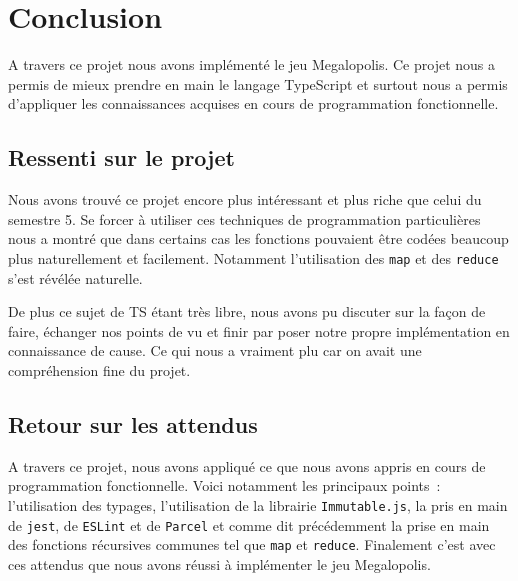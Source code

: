 \section{Conclusion}

A travers ce projet nous avons implémenté le jeu Megalopolis. Ce projet nous a permis de mieux prendre en main le langage TypeScript et surtout nous a permis d'appliquer les connaissances acquises en cours de programmation fonctionnelle.

\subsection{Ressenti sur le projet}

Nous avons trouvé ce projet encore plus intéressant et plus riche que celui du semestre 5. Se forcer à utiliser ces techniques de programmation particulières nous a montré que dans certains cas les fonctions pouvaient être codées beaucoup plus naturellement et facilement. Notamment l'utilisation des \texttt{map} et des \texttt{reduce} s'est révélée naturelle.

De plus ce sujet de TS étant très libre, nous avons pu discuter sur la façon de faire, échanger nos points de vu et finir par poser notre propre implémentation en connaissance de cause. Ce qui nous a vraiment plu car on avait une compréhension fine du projet.

\subsection{Retour sur les attendus}

A travers ce projet, nous avons appliqué ce que nous avons appris en cours de programmation fonctionnelle. Voici notamment les principaux points~: l'utilisation des typages, l'utilisation de la librairie \texttt{Immutable.js}, la pris en main de \texttt{jest}, de \texttt{ESLint} et de \texttt{Parcel} et comme dit précédemment la prise en main des fonctions récursives communes tel que \texttt{map} et \texttt{reduce}. Finalement c'est avec ces attendus que nous avons réussi à implémenter le jeu Megalopolis.
